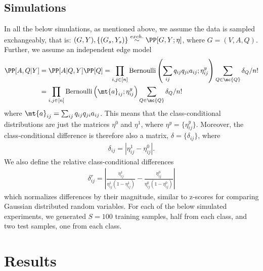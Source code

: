 \subsection{Simulations} %
\label{sub:simulations}

In all the below simulations, as mentioned above, we assume the data is sampled exchangeably, that is: $(G,Y), \{(G_s,Y_s)\} \overset{exch.}{\sim} \PP[G,Y; \eta]$, where $G=(V,A,Q)$.  Further, we assume an independent edge model
\begin{align}
\PP[A,Q | Y] &= \PP[A|Q,Y] \PP[Q] = \prod_{i,j \in [n]} \text{Bernoulli}\left(\sum_{ij} q_{ij} q_{ji} a_{ij}; \eta_{ij}^y\right) \sum_{Q\in \mc{Q}} \delta_Q/n! \\
&=  \prod_{i,j \in [n]} \text{Bernoulli}\left(\mt{a}_{ij}; \eta_{ij}^y\right) \sum_{Q\in \mc{Q}} \delta_Q/n!
\end{align}
where $\mt{a}_{ij} = \sum_{ij} q_{ij} q_{ji} a_{ij}$.  This means that the class-conditional distributions are just the matrices $\eta^0$ and $\eta^1$, where $\eta^y=\{\eta_{ij}^y\}$. Moreover, the class-conditional difference is therefore also a matrix, $\delta=\{\delta_{ij}\}$, where
\begin{align}
	\delta_{ij} = | \eta_{ij}^1-\eta_{ij}^0|.
\end{align}
We also define the relative class-conditional differences
\begin{align}
	\delta_{ij}^r = \left| \frac{\eta_{ij}^1}{\eta_{ij}^1 (1-\eta_{ij}^1)} - \frac{\eta_{ij}^0}{\eta_{ij}^0 (1-\eta_{ij}^0)} \right|
\end{align}
which normalizes differences by their magnitude, similar to z-scores for comparing Gaussian distributed random variables. For each of the below simulated experiments, we generated $S=100$ training samples, half from each class, and two test samples, one from each class.  













\section{Results} %
\label{sec:results}


